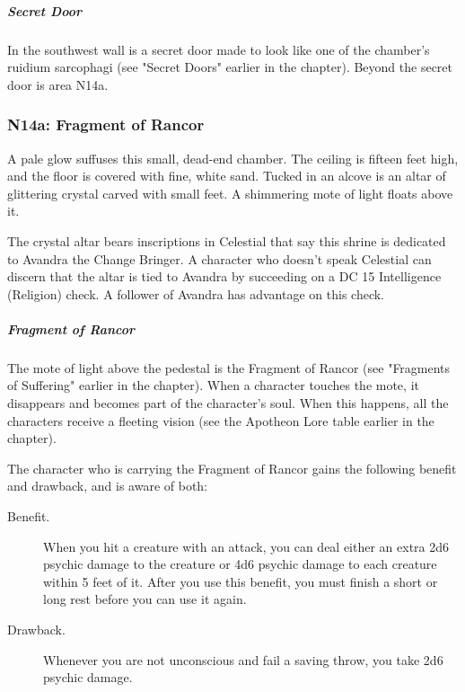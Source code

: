 \documentclass[10pt,a4paper,twoside,bg=print,twocolumn,openany,nodeprecatedcode]{dndbook}
\begin{document}
\subparagraph{Secret Door}
In the southwest wall is a secret door made to look like one of the chamber's ruidium sarcophagi (see "Secret Doors" earlier in the chapter). Beyond the secret door is area N14a.

\subsubsection{N14a: Fragment of Rancor}
\begin{DndReadAloud}{}
A pale glow suffuses this small, dead-end chamber. The ceiling is fifteen feet high, and the floor is covered with fine, white sand. Tucked in an alcove is an altar of glittering crystal carved with small feet. A shimmering mote of light floats above it.

\end{DndReadAloud}

The crystal altar bears inscriptions in Celestial that say this shrine is dedicated to Avandra the Change Bringer. A character who doesn't speak Celestial can discern that the altar is tied to Avandra by succeeding on a DC 15 Intelligence (Religion) check. A follower of Avandra has advantage on this check.

\subparagraph{Fragment of Rancor}
The mote of light above the pedestal is the Fragment of Rancor (see "Fragments of Suffering" earlier in the chapter). When a character touches the mote, it disappears and becomes part of the character's soul. When this happens, all the characters receive a fleeting vision (see the Apotheon Lore table earlier in the chapter).

The character who is carrying the Fragment of Rancor gains the following benefit and drawback, and is aware of both:

\begin{DndSidebar}[float=!b]{}

\begin{description}
\item[Benefit.]
When you hit a creature with an attack, you can deal either an extra 2d6 psychic damage to the creature or 4d6 psychic damage to each creature within 5 feet of it. After you use this benefit, you must finish a short or long rest before you can use it again.
\item[Drawback.]
Whenever you are not unconscious and fail a saving throw, you take 2d6 psychic damage.
\end{description}



\end{DndSidebar}
\end{document}
